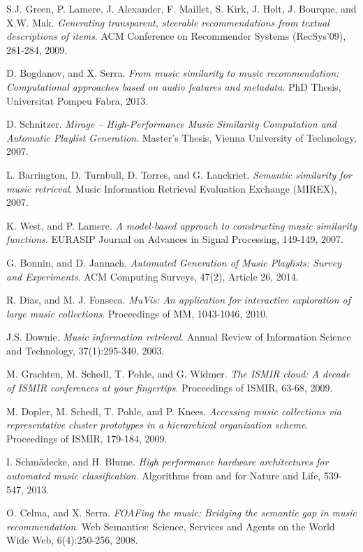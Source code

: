 \documentclass[11pt, oneside]{Thesis} %
\begin{document}
\begin{thebibliography}{99}
S.J. Green, P. Lamere, J. Alexander, F. Maillet, S. Kirk, J. Holt, J. Bourque, and X.W. Mak.
\textit{Generating transparent, steerable recommendations from textual descriptions of items}.
ACM Conference on Recommender Systems (RecSys'09), 281-284, 2009.

D. Bogdanov, and X. Serra.
\textit{From music similarity to music recommendation: Computational approaches based on audio features and metadata}.
PhD Thesis, Universitat Pompeu Fabra, 2013.

D. Schnitzer.
\textit{Mirage – High-Performance Music Similarity Computation and Automatic Playlist Generation}.
Master's Thesis, Vienna University of Technology, 2007.

L. Barrington, D. Turnbull, D. Torres, and G. Lanckriet.
\textit{Semantic similarity for music retrieval}.
Music Information Retrieval Evaluation Exchange (MIREX), 2007.

K. West, and P. Lamere.
\textit{A model-based approach to constructing music similarity functions}.
EURASIP Journal on Advances in Signal Processing, 149-149, 2007.

G. Bonnin, and D. Jannach.
\textit{Automated Generation of Music Playlists: Survey and Experiments}.
ACM Computing Surveys, 47(2), Article 26, 2014.

R. Dias, and M. J. Fonseca.
\textit{MuVis: An application for interactive exploration of large music collections}.
Proceedings of MM, 1043-1046, 2010.

J.S. Downie.
\textit{Music information retrieval}.
Annual Review of Information Science and Technology, 37(1):295-340, 2003.

M. Grachten, M. Schedl, T. Pohle, and G. Widmer.
\textit{The ISMIR cloud: A decade of ISMIR conferences at your fingertips}.
Proceedings of ISMIR, 63-68, 2009.

M. Dopler, M. Schedl, T. Pohle, and P. Knees.
\textit{Accessing music collections via representative cluster prototypes in a hierarchical organization scheme}.
Proceedings of ISMIR, 179-184, 2009.

I. Schm\"{a}decke, and H. Blume.
\textit{High performance hardware architectures for automated music classification}.
Algorithms from and for Nature and Life, 539-547, 2013.

O. Celma, and X. Serra.
\textit{FOAFing the music: Bridging the semantic gap in music recommendation}.
Web Semantics: Science, Services and Agents on the World Wide Web, 6(4):250-256, 2008.


\end{thebibliography}
\end{document}
